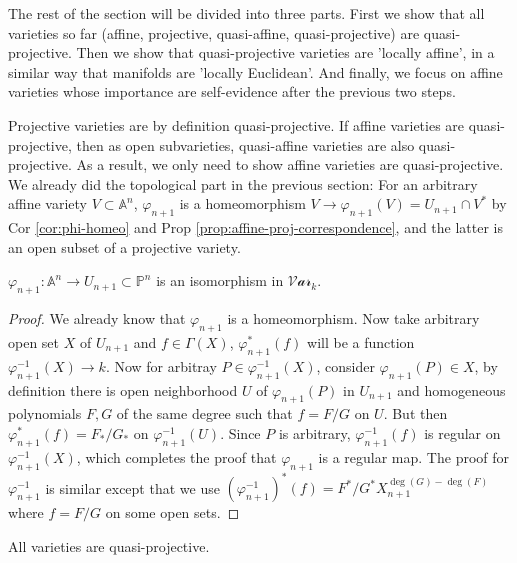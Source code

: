 \documentclass{note-eng}
\begin{document}
The rest of the section will be divided into three parts. First we show that all varieties so far (affine, projective, quasi-affine, quasi-projective) are quasi-projective. Then we show that quasi-projective varieties are 'locally affine', in a similar way that manifolds are 'locally Euclidean'. And finally, we focus on affine varieties whose importance are self-evidence after the previous two steps.

Projective varieties are by definition quasi-projective. If affine varieties are quasi-projective, then as open subvarieties, quasi-affine varieties are also quasi-projective. As a result, we only need to show affine varieties are quasi-projective. We already did the topological part in the previous section: For an arbitrary affine variety $V \subset \mathbb{A}^n$, $\varphi_{n + 1}$ is a homeomorphism $V \rightarrow \varphi_{n + 1} (V) = U_{n + 1} \cap V^\ast$ by Cor \ref{cor:phi-homeo} and Prop \ref{prop:affine-proj-correspondence}, and the latter is an open subset of a projective variety. 

\begin{proposition} \label{prop:phi-iso}
    $\varphi_{n + 1}: \mathbb{A}^n \rightarrow U_{n + 1} \subset \mathbb{P}^n$ is an isomorphism in $\mathscr{Var}_k$.
\end{proposition}

\begin{proof}
    We already know that $\varphi_{n + 1}$ is a homeomorphism. Now take arbitrary open set $X$ of $U_{n + 1}$ and $f \in \Gamma(X)$, $\varphi_{n + 1}^\ast(f)$ will be a function $\varphi_{n + 1} ^{-1} (X) \rightarrow k$. Now for arbitray $P \in \varphi_{n + 1} ^{-1}(X)$, consider $\varphi_{n + 1}(P) \in X$, by definition there is open neighborhood $U$ of $\varphi_{n + 1}(P)$ in $U_{n + 1}$ and homogeneous polynomials $F, G$ of the same degree such that $f = F / G$ on $U$. But then $\varphi_{n + 1}^\ast(f) = F_\ast / G_\ast$ on $\varphi_{n + 1}^{-1}(U)$. Since $P$ is arbitrary, $\varphi_{n + 1} ^{-1}(f)$ is regular on $\varphi_{n + 1} ^{-1}(X)$, which completes the proof that $\varphi_{n + 1}$ is a regular map. The proof for $\varphi_{n + 1}^{-1}$ is  similar except that we use $(\varphi_{n + 1} ^{-1})^\ast(f) = F^\ast / G^\ast X_{n + 1}^{\deg (G) - \deg(F)}$ where $f = F / G$ on some open sets.
\end{proof}

\begin{corollary}
    All varieties are quasi-projective.
\end{corollary}
\end{document}
